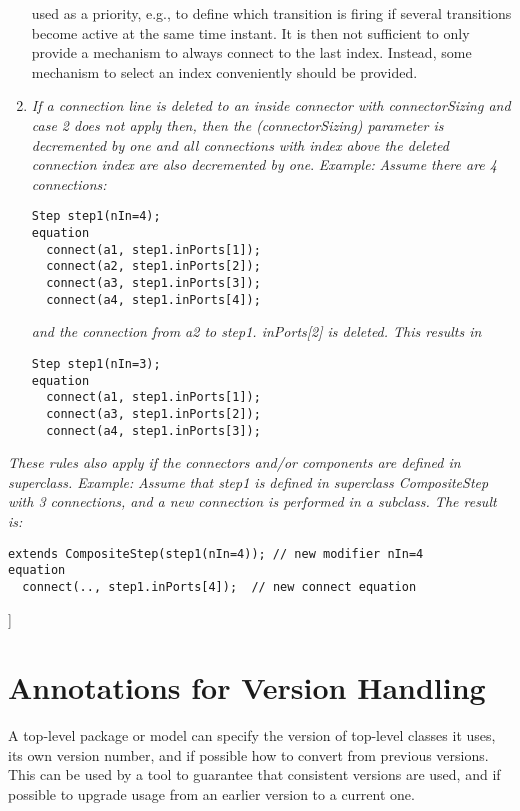 \begin{enumerate}
{  used as a priority, e.g., to define which transition is firing if
  several transitions become active at the same time instant. It is then
  not sufficient to only provide a mechanism to always connect to the
  last index. Instead, some mechanism to select an index conveniently
  should be provided. }
\item
  \emph{If a connection line is deleted to an inside connector with
  connectorSizing and case 2 does not apply then, then the
  (connectorSizing) parameter is decremented by one and all connections
  with index above the deleted connection index are also decremented by
  one}. \emph{Example:} \emph{Assume there are 4 connections:}
\begin{lstlisting}[language=modelica]
  Step step1(nIn=4);
equation
  connect(a1, step1.inPorts[1]);
  connect(a2, step1.inPorts[2]);
  connect(a3, step1.inPorts[3]);
  connect(a4, step1.inPorts[4]);
\end{lstlisting}
  \emph{and the connection from a2 to step1. inPorts{[}2{]} is deleted.
  This results in}
\begin{lstlisting}[language=modelica]
  Step step1(nIn=3);
equation
  connect(a1, step1.inPorts[1]);
  connect(a3, step1.inPorts[2]);
  connect(a4, step1.inPorts[3]);
\end{lstlisting}
\end{enumerate}

\emph{These rules also apply if the connectors and/or components are
defined in {superclass}. Example:} \emph{Assume that step1 is defined in
superclass CompositeStep with 3 connections, and a new connection is
performed in a subclass. The result is:}
\begin{lstlisting}[language=modelica]
  extends CompositeStep(step1(nIn=4)); // new modifier nIn=4
equation
  connect(.., step1.inPorts[4]);  // new connect equation
\end{lstlisting}
{]}

\section{Annotations for Version Handling}

A top-level package or model can specify the version of top-level
classes it uses, its own version number, and if possible how to convert
from previous versions. This can be used by a tool to guarantee that
consistent versions are used, and if possible to upgrade usage from an
earlier version to a current one.


